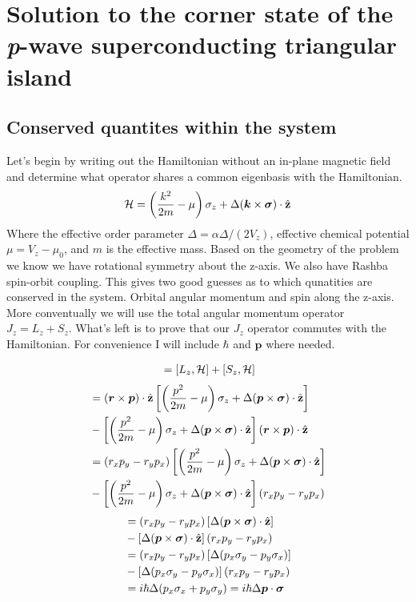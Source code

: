 \chapter{Solution to the corner state of the \textit{p}-wave superconducting triangular island}
\section{Conserved quantites within the system}

Let's begin by writing out the Hamiltonian without an in-plane magnetic field and determine what operator shares a common eigenbasis with the Hamiltonian.
\begin{equation}
  \Ham = \left(\dfrac{k^2}{2m} - \mu\right) \sz + \Delta (\bm{k} \times \bm{\sigma}) \cdot \hat{z}
\end{equation}
Where the effective order parameter $\Delta = \alpha\Delta/(2V_z)$, effective chemical potential $\mu = V_z-\mu_0$, and $m$ is the effective mass. 
Based on the geometry of the problem we know we have rotational symmetry about the z-axis. 
We also have Rashba spin-orbit coupling.
This gives two good guesses as to which qunatities are conserved in the system.
Orbital angular momentum and spin along the z-axis. 
More conventually we will use the total angular momentum operator $J_z = L_z + S_z$.
What's left is to prove that our $J_z$ operator commutes with the Hamiltonian.
For convenience I will include $\hbar$ and $\bm{p}$ where needed.

\begin{align*}
  [J_z,\Ham] &= [L_z,\Ham] + [S_z,\Ham] \\
\end{align*}
\begin{align*}
  [L_z,\Ham] &= (\bm{r}\times\bm{p})\cdot\hat{z}\left[\left(\dfrac{p^2}{2m} - \mu\right) \sz + \Delta (\bm{p} \times \bm{\sigma}) \cdot \hat{z}\right] \\ 
  &-\left[\left(\dfrac{p^2}{2m} - \mu\right) \sz + \Delta (\bm{p} \times \bm{\sigma}) \cdot \hat{z}\right](\bm{r}\times\bm{p})\cdot\hat{z} \\
  &= (r_xp_y-r_yp_x)\left[\left(\dfrac{p^2}{2m} - \mu\right) \sz + \Delta (\bm{p} \times \bm{\sigma}) \cdot \hat{z}\right] \\ 
  &-\left[\left(\dfrac{p^2}{2m} - \mu\right) \sz + \Delta (\bm{p} \times \bm{\sigma}) \cdot \hat{z}\right](r_xp_y-r_yp_x) \\
\end{align*}
\begin{align*}
  &= (r_xp_y-r_yp_x)\left[\Delta (\bm{p} \times \bm{\sigma}) \cdot \hat{z}\right] \\ 
  &-\left[\Delta (\bm{p} \times \bm{\sigma}) \cdot \hat{z}\right](r_xp_y-r_yp_x) \\
  &= (r_xp_y-r_yp_x)\left[\Delta (p_x\sy-p_y\sx)\right] \\ 
  &-\left[\Delta (p_x\sy-p_y\sx)\right](r_xp_y-r_yp_x) \\
  &= i\hbar\Delta (p_x\sx + p_y\sy) = i\hbar\Delta\bm{p}\cdot\bm{\sigma}
\end{align*}


